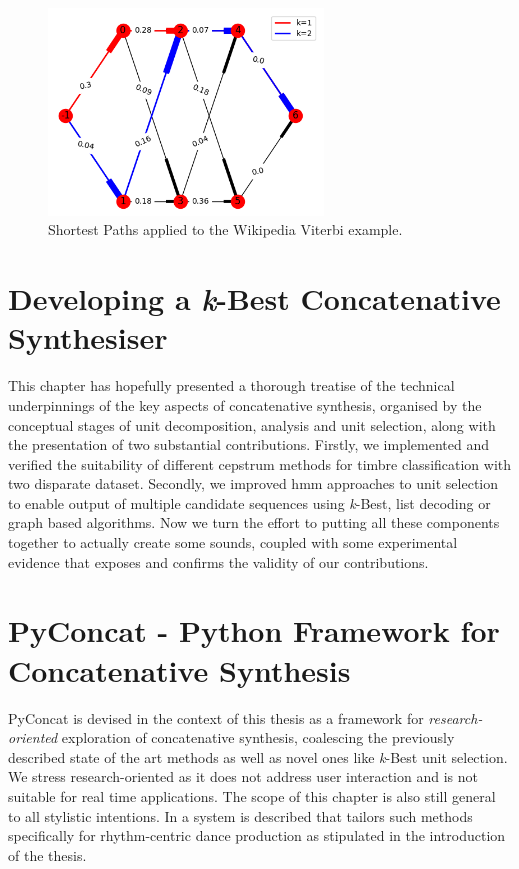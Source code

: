 {{{{{{{{\begin{figure}
	\begin{center}
		\includegraphics[width=0.65\textwidth]{ch05_pyconcat/figures/wiki_hmm.png}
	\end{center}
	\caption[Shortest paths applied to the Wikipedia Viterbi example]{Shortest Paths applied to the Wikipedia Viterbi example.}
	\label{fig:graph_hmm}
\end{figure}

\section{Developing a \textit{k}-Best Concatenative Synthesiser}

This chapter has hopefully presented a thorough treatise of the technical underpinnings of the key aspects of concatenative synthesis, organised by the conceptual stages of unit decomposition, analysis and unit selection, along with the presentation of two substantial contributions. Firstly, we implemented and verified the suitability of different cepstrum methods for timbre classification with two disparate dataset. Secondly, we improved \acrshort{hmm} approaches to unit selection to enable output of multiple candidate sequences using \textit{k}-Best, list decoding or graph based algorithms. Now we turn the effort to putting all these components together to actually create some sounds, coupled with some experimental evidence  that exposes and confirms the validity of our contributions. 
 
\section{PyConcat - Python Framework for Concatenative Synthesis}

PyConcat is devised in the context of this thesis as a framework for \textit{research-oriented} exploration of concatenative synthesis, coalescing the previously described state of the art methods as well as novel ones like \textit{k}-Best unit selection. We stress research-oriented as it does not address user interaction and is not suitable for real time applications. The scope of this chapter is also still general to all stylistic intentions. In  a system is described that tailors such methods specifically for rhythm-centric dance production as stipulated in the introduction of the thesis.

}}}}}}}}
